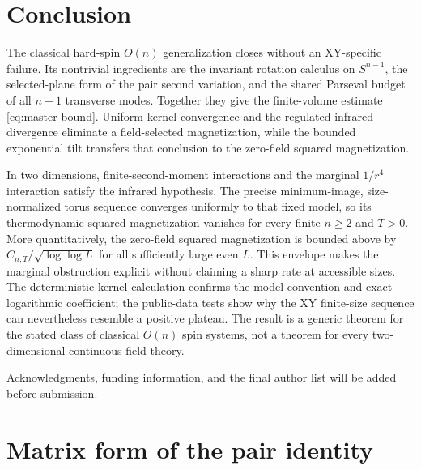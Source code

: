 \documentclass[aps,prb,twocolumn,groupedaddress,amsmath,amssymb,
               superscriptaddress,nofootinbib,floatfix]{revtex4-2}
\theoremstyle{plain}
\theoremstyle{definition}
\begin{document}
\section{Conclusion}

The classical hard-spin $O(n)$ generalization closes without an XY-specific
failure.  Its nontrivial ingredients are the invariant rotation calculus on
$S^{n-1}$, the selected-plane form of the pair second variation, and the
shared Parseval budget of all $n-1$ transverse modes.  Together they give the
finite-volume estimate \eqref{eq:master-bound}.  Uniform kernel convergence
and the regulated infrared divergence eliminate a field-selected
magnetization, while the bounded exponential tilt transfers that conclusion
to the zero-field squared magnetization.

In two dimensions, finite-second-moment interactions and the marginal
$1/r^4$ interaction satisfy the infrared hypothesis.  The precise
minimum-image, size-normalized torus sequence converges uniformly to that
fixed model, so its thermodynamic squared magnetization vanishes for every
finite $n\ge2$ and $T>0$.  More quantitatively, the zero-field squared
magnetization is bounded above by
$C_{n,T}/\sqrt{\log\log L}$ for all sufficiently large even $L$.  This
envelope makes the marginal obstruction explicit without claiming a sharp
rate at accessible sizes.  The deterministic kernel calculation confirms
the model convention and exact logarithmic coefficient; the public-data
tests show why the XY finite-size sequence can nevertheless resemble a
positive plateau.  The result is a generic theorem for the stated class of
classical $O(n)$ spin systems, not a theorem for every two-dimensional
continuous field theory.

\begin{acknowledgments}
Acknowledgments, funding information, and the final author list will be
added before submission.
\end{acknowledgments}

\appendix

\section{Matrix form of the pair identity}
\label{app:matrix}
\end{document}
